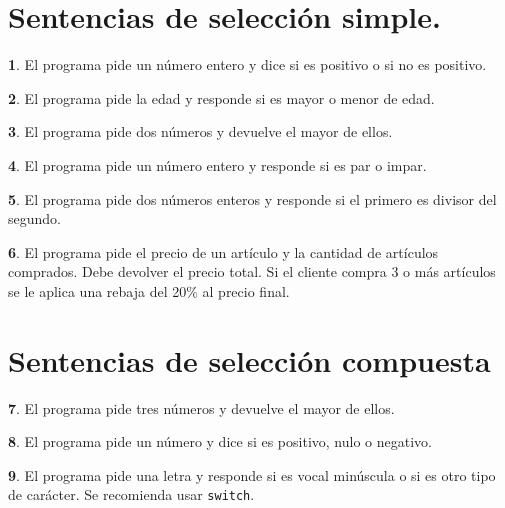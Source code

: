 \documentclass[a4paper, 12pt]{article}
\theoremstyle{definition}
\newtheorem{ejer}{}[section]
\begin{document}
\newpage

\section{Sentencias de selección simple.}

\begin{ejer}
El programa pide un número entero y dice si es positivo o si no es positivo.
\end{ejer}

\begin{ejer}
El programa pide la edad y responde si es mayor o menor de edad.
\end{ejer}

\begin{ejer}
El programa pide dos números y devuelve el mayor de ellos.
\end{ejer}

\begin{ejer}
El programa pide un número entero y responde si es par o impar.
\end{ejer}

\begin{ejer}
El programa pide dos números enteros y responde si el primero es divisor del segundo.
\end{ejer}

\begin{ejer}
El programa pide el precio de un artículo y la cantidad de artículos comprados. Debe devolver el precio total. Si el cliente compra 3 o más artículos se le aplica una rebaja del 20\% al precio final.
\end{ejer}

\newpage

\section{Sentencias de selección compuesta}

\begin{ejer}
El programa pide tres números y devuelve el mayor de ellos.
\end{ejer}

\begin{ejer}
El programa pide un número y dice si es positivo, nulo o negativo.
\end{ejer}

\begin{ejer}
El programa pide una letra y responde si es vocal minúscula o si es otro tipo de carácter. Se recomienda usar \verb|switch|.
\end{ejer}
\end{document}
